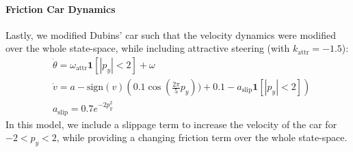 \documentclass{l4dc2026}
\def\1{\bm{1}}
\begin{document}
\paragraph{Friction Car Dynamics} Lastly, we modified Dubins' car such that the velocity dynamics were modified over the whole state-space, while including attractive steering (with $k_\text{attr}=-1.5$): 
\begin{subequations}
    \begin{align}
    &\dot\theta = {\omega}_\text{attr}\1[|p_y| < 2] + \omega \\
    &\dot v =  a-\text{sign}(v)\left(0.1\cos(\frac{2\pi}{5}p_y)) + 0.1 - a_\text{slip}\1[|p_y| < 2]\right)\\
    &a_\text{slip} = 0.7e^{-2p_y^2} 
    \end{align}
\end{subequations}
In this model, we include a slippage term to increase the velocity of the car for $-2 < p_y < 2$, while providing a changing friction term over the whole state-space. 
\end{document}
